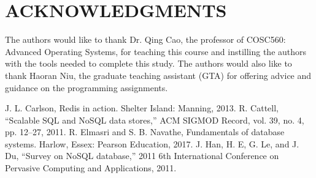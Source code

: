 \documentclass[letterpaper, 10 pt, conference]{ieeeconf}
\begin{document}
\section*{ACKNOWLEDGMENTS}

The authors would like to thank Dr. Qing Cao, the professor of COSC560: Advanced Operating Systems, for teaching this course and instilling the authors with the tools needed to complete this study. The authors would also like to thank Haoran Niu, the graduate teaching assistant (GTA) for offering advice and guidance on the programming assignments.








\begin{thebibliography}{99}

 J. L. Carlson, Redis in action. Shelter Island: Manning, 2013. 
 R. Cattell, “Scalable SQL and NoSQL data stores,” ACM SIGMOD Record, vol. 39, no. 4, pp. 12–27, 2011.
 R. Elmasri and S. B. Navathe, Fundamentals of database systems. Harlow, Essex: Pearson Education, 2017.
   J. Han, H. E, G. Le, and J. Du, “Survey on NoSQL database,” 2011 6th International Conference on Pervasive Computing and Applications, 2011.

\end{thebibliography}

 
\end{document}
